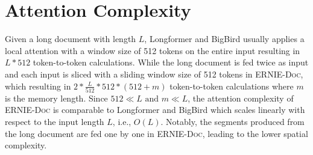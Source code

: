 \documentclass[11pt,a4paper]{article}
\newcommand{\mname}{\textsc{ERNIE-Doc}\xspace}
\begin{document}
\section{Attention Complexity}
Given a long document with length $L$, Longformer and BigBird usually applies a local attention with a window size of 512 tokens on the entire input resulting in $L*512$ token-to-token calculations. While the long document is fed twice as input and each input is sliced with a sliding window size of 512 tokens in \mname, which resulting in $2*\frac{L}{512}*512*(512+m)$ token-to-token calculations where $m$ is the memory length. Since $512 \ll L \text{ and } m \ll L$, the attention complexity of \mname is comparable to Longformer and BigBird which scales linearly with respect to the input length $L$, i.e., $O(L)$. Notably, the segments produced from the long document are fed one by one in \mname, leading to the lower spatial complexity.
\end{document}

